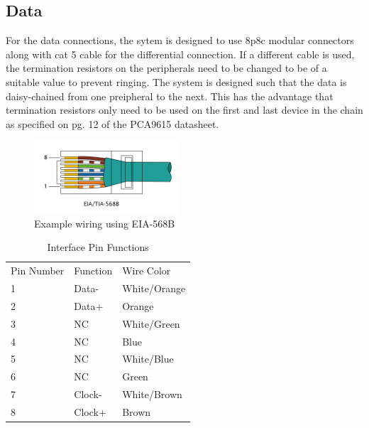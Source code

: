 \documentclass{book}
\begin{document}
\subsection{Data}
For the data connections, the sytem is designed to use 8p8c modular connectors along with cat 5 cable for the differential connection. If a different cable is 
used, the termination resistors on the peripherals need to be changed to be of a suitable value to prevent ringing. The system is designed such that the 
data is daisy-chained from one preipheral to the next. This has the advantage that termination resistors only need to be used on the first and last device in 
the chain as specified on pg. 12 of the PCA9615 datasheet\cite{nxp:pca9615}.

\begin{figure}
  \begin{center}
    \includegraphics[width=0.48\textwidth]{RJ-45_TIA-568B_Left.png}
  \end{center}
  \caption[Example wiring using EIA-568B]{Example wiring using EIA-568B\cite{img:eia568}\label{fig:eia568}}
\end{figure}

\begin{table}
\centering
\begin{tabular}{| l | l | l |}
Pin Number & Function & Wire Color\\
1 & Data- & White/Orange\\
2 & Data+ & Orange\\
3 & NC & White/Green\\
4 & NC & Blue\\
5 & NC & White/Blue\\
6 & NC & Green\\
7 & Clock- & White/Brown\\
8 & Clock+ & Brown\\
\end{tabular}
\caption{Interface Pin Functions\label{tab:intpin}}
\end{table}
\end{document}
